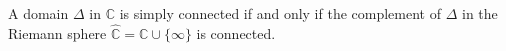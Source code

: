 A domain $\Delta$ in $\mathbb{C}$ is simply connected if and only if the complement of $\Delta$ in the Riemann sphere $\hat{\mathbb{C}} = \mathbb{C} \cup \{\infty\}$ is connected.
